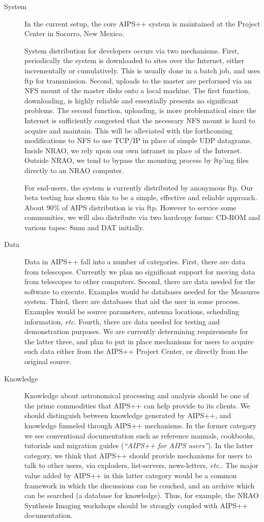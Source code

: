 \begin{description}
\item[System] In the current setup, the core AIPS++ system is maintained 
at the Project Center in Socorro, New Mexico. 

System distribution for developers occurs via two mechanisms. First,
periodically the system is downloaded to sites over the Internet,
either incrementally or cumulatively.  This is usually done in a batch
job, and uses ftp for transmission.  Second, uploads to the master are
performed via an NFS mount of the master disks onto a local machine.
The first function, downloading, is highly reliable and essentially
presents no significant problems.  The second function, uploading, is
more problematical since the Internet is sufficiently congested that
the necessary NFS mount is hard to acquire and maintain.  This will be
alleviated with the forthcoming modifications to NFS to use TCP/IP in
place of simple UDP datagrams.  Inside NRAO, we rely upon our own
intranet in place of the Internet.  Outside NRAO, we tend to bypass
the mounting process by ftp'ing files directly to an NRAO computer.

For end-users, the system is currently distributed by anonymous ftp.
Our beta testing has shown this to be a simple, effective and reliable
approach.  About 90\% of AIPS distribution is via ftp. However to
service some communities, we will also distribute via two hardcopy
forms: CD-ROM and various tapes: 8mm and DAT initially.

\item[Data] Data in AIPS++ fall into a number of categories. First,
there are data from telescopes. Currently we plan no significant
support for moving data from telescopes to other computers. Second,
there are data needed for the software to execute. Examples would be
databases needed for the Measures system. Third, there are databases
that aid the user in some process. Examples would be source
parameters, antenna locations, scheduling information, {\em etc.}
Fourth, there are data needed for testing and demonstration purposes.
We are currently determining requirements for the latter three, and
plan to put in place mechanisms for users to acquire such data either
from the AIPS++ Project Center, or directly from the original source.

\item[Knowledge] Knowledge about astronomical processing and analysis
should be one of the prime commodities that AIPS++ can help provide to
its clients. We should distinguish between knowledge generated by
AIPS++, and knowledge funneled through AIPS++ mechanisms. In the
former category we see conventional documentation such as reference
manuals, cookbooks, tutorials and migration guides ({\em ``AIPS++ for
AIPS users''}).  In the latter category, we think that AIPS++ should
provide mechanisms for users to talk to other users, via exploders,
list-servers, news-letters, {\em etc.}. The major value added by AIPS++
in this latter category would be a common framework in which the
discussions can be couched, and an archive which can be searched (a
database for knowledge). Thus, for example, the NRAO Synthesis
Imaging workshops should be strongly coupled with AIPS++
documentation.


\end{description}
